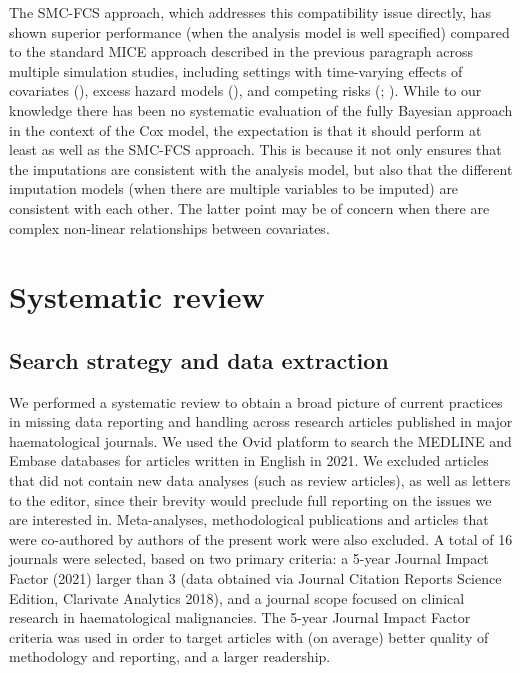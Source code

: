 \documentclass[
  letterpaper,
  DIV=11,
  numbers=noendperiod]{scrreprt}
\begin{document}
The SMC-FCS approach, which addresses this compatibility issue directly,
has shown superior performance (when the analysis model is well
specified) compared to the standard MICE approach described in the
previous paragraph across multiple simulation studies, including
settings with time-varying effects of covariates
(),
excess hazard models
(), and competing risks
(;
). While to our knowledge there has been no
systematic evaluation of the fully Bayesian approach in the context of
the Cox model, the expectation is that it should perform at least as
well as the SMC-FCS approach. This is because it not only ensures that
the imputations are consistent with the analysis model, but also that
the different imputation models (when there are multiple variables to be
imputed) are consistent with each other. The latter point may be of
concern when there are complex non-linear relationships between
covariates.

\section{Systematic review}\label{systematic-review}

\subsection{Search strategy and data
extraction}\label{search-strategy-and-data-extraction}

We performed a systematic review to obtain a broad picture of current
practices in missing data reporting and handling across research
articles published in major haematological journals. We used the Ovid
platform to search the MEDLINE and Embase databases for articles written
in English in 2021. We excluded articles that did not contain new data
analyses (such as review articles), as well as letters to the editor,
since their brevity would preclude full reporting on the issues we are
interested in. Meta-analyses, methodological publications and articles
that were co-authored by authors of the present work were also excluded.
A total of 16 journals were selected, based on two primary criteria: a
5-year Journal Impact Factor (2021) larger than 3 (data obtained via
Journal Citation Reports Science Edition, Clarivate Analytics 2018), and
a journal scope focused on clinical research in haematological
malignancies. The 5-year Journal Impact Factor criteria was used in
order to target articles with (on average) better quality of methodology
and reporting, and a larger readership.
\end{document}
